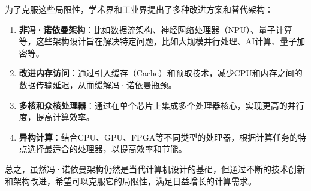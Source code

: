 \documentclass[12pt]{article} %
\theoremstyle{definition}
\begin{document}
为了克服这些局限性，学术界和工业界提出了多种改进方案和替代架构：
\begin{enumerate}
  \item \textbf{非冯·诺依曼架构}：比如数据流架构、神经网络处理器（NPU）、量子计算等，这些架构设计旨在解决特定问题，比如大规模并行处理、AI计算、量子加密等。
  \item \textbf{改进内存访问}：通过引入缓存（Cache）和预取技术，减少CPU和内存之间的数据传输延迟，从而缓解冯·诺依曼瓶颈。
  \item \textbf{多核和众核处理器}：通过在单个芯片上集成多个处理器核心，实现更高的并行度，提高计算效率。
  \item \textbf{异构计算}：结合CPU、GPU、FPGA等不同类型的处理器，根据计算任务的特点选择最适合的处理器，以提高效率和节能。
\end{enumerate}

总之，虽然冯·诺依曼架构仍然是当代计算机设计的基础，但通过不断的技术创新和架构改进，希望可以克服它的局限性，满足日益增长的计算需求。

\newpage



\end{document}
